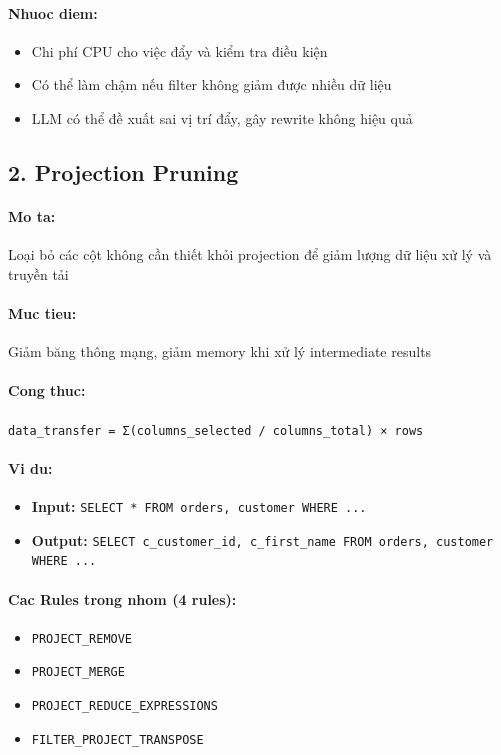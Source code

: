 \paragraph{Nhuoc diem:}
\begin{itemize}
\item Chi phí CPU cho việc đẩy và kiểm tra điều kiện
\item Có thể làm chậm nếu filter không giảm được nhiều dữ liệu
\item LLM có thể đề xuất sai vị trí đẩy, gây rewrite không hiệu quả
\end{itemize}
\newpage

\subsection*{\bfseries 2. Projection Pruning}
\paragraph{Mo ta:} Loại bỏ các cột không cần thiết khỏi projection để giảm lượng dữ liệu xử lý và truyền tải
\paragraph{Muc tieu:} Giảm băng thông mạng, giảm memory khi xử lý intermediate results
\paragraph{Cong thuc:} \texttt{data_transfer = Σ(columns_selected / columns_total) × rows}
\paragraph{Vi du:}
\begin{itemize}
\item \textbf{Input:} \texttt{SELECT * FROM orders, customer WHERE ...}
\item \textbf{Output:} \texttt{SELECT c_customer_id, c_first_name FROM orders, customer WHERE ...}
\end{itemize}
\paragraph{Cac Rules trong nhom (4 rules):}
\begin{itemize}
\item \texttt{PROJECT_REMOVE}
\item \texttt{PROJECT_MERGE}
\item \texttt{PROJECT_REDUCE_EXPRESSIONS}
\item \texttt{FILTER_PROJECT_TRANSPOSE}
\end{itemize}
